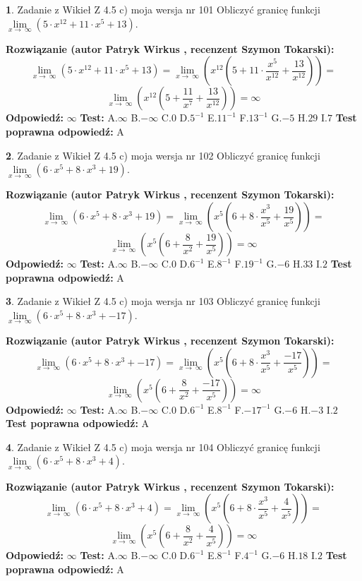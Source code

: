 \documentclass[12pt, a4paper]{article}
\theoremstyle{definition} %
\newtheorem{zad}{}
\newcommand{\zadStart}[1]{\begin{zad}#1\newline}
\newcommand{\zadStop}{\end{zad}}
\newcommand{\rozwStart}[2]{\noindent \textbf{Rozwiązanie (autor #1 , recenzent #2): }\newline}
\newcommand{\rozwStop}{\newline}
\newcommand{\odpStart}{\noindent \textbf{Odpowiedź:}\newline}
\newcommand{\odpStop}{\newline}
\newcommand{\testStart}{\noindent \textbf{Test:}\newline}
\newcommand{\testStop}{\newline}
\newcommand{\kluczStart}{\noindent \textbf{Test poprawna odpowiedź:}\newline}
\newcommand{\kluczStop}{\newline}
\begin{document}
\zadStart{Zadanie z Wikieł Z 4.5 c) moja wersja nr 101}
Obliczyć granicę funkcji  $\lim\limits_{x\to\ \infty}(5 \cdot x^{12}+11 \cdot x^{5}+13)$.
\zadStop
\rozwStart{Patryk Wirkus}{Szymon Tokarski}
$$\lim\limits_{x\to\ \infty}(5 \cdot x^{12}+11 \cdot x^{5}+13) = \lim\limits_{x\to\ \infty}(x^{12}(5 +11 \cdot \frac{x^{5}}{x^{12}}+\frac{13}{x^{12}})) =$$ $$\lim\limits_{x\to\ \infty}(x^{12}(5 +\frac{11}{x^{7}}+\frac{13}{x^{12}})) =\infty$$
\rozwStop
\odpStart
$\infty$
\odpStop
\testStart
A.$\infty$ B.$-\infty$ C.$0$ D.$5^{-1}$ E.$11^{-1}$
F.$13^{-1}$ G.$-5$
H.$29$
I.$7$
\testStop
\kluczStart
A
\kluczStop



\zadStart{Zadanie z Wikieł Z 4.5 c) moja wersja nr 102}
Obliczyć granicę funkcji  $\lim\limits_{x\to\ \infty}(6 \cdot x^{5}+8 \cdot x^{3}+19)$.
\zadStop
\rozwStart{Patryk Wirkus}{Szymon Tokarski}
$$\lim\limits_{x\to\ \infty}(6 \cdot x^{5}+8 \cdot x^{3}+19) = \lim\limits_{x\to\ \infty}(x^{5}(6 +8 \cdot \frac{x^{3}}{x^{5}}+\frac{19}{x^{5}})) =$$ $$\lim\limits_{x\to\ \infty}(x^{5}(6 +\frac{8}{x^{2}}+\frac{19}{x^{5}})) =\infty$$
\rozwStop
\odpStart
$\infty$
\odpStop
\testStart
A.$\infty$ B.$-\infty$ C.$0$ D.$6^{-1}$ E.$8^{-1}$
F.$19^{-1}$ G.$-6$
H.$33$
I.$2$
\testStop
\kluczStart
A
\kluczStop



\zadStart{Zadanie z Wikieł Z 4.5 c) moja wersja nr 103}
Obliczyć granicę funkcji  $\lim\limits_{x\to\ \infty}(6 \cdot x^{5}+8 \cdot x^{3}+-17)$.
\zadStop
\rozwStart{Patryk Wirkus}{Szymon Tokarski}
$$\lim\limits_{x\to\ \infty}(6 \cdot x^{5}+8 \cdot x^{3}+-17) = \lim\limits_{x\to\ \infty}(x^{5}(6 +8 \cdot \frac{x^{3}}{x^{5}}+\frac{-17}{x^{5}})) =$$ $$\lim\limits_{x\to\ \infty}(x^{5}(6 +\frac{8}{x^{2}}+\frac{-17}{x^{5}})) =\infty$$
\rozwStop
\odpStart
$\infty$
\odpStop
\testStart
A.$\infty$ B.$-\infty$ C.$0$ D.$6^{-1}$ E.$8^{-1}$
F.$-17^{-1}$ G.$-6$
H.$-3$
I.$2$
\testStop
\kluczStart
A
\kluczStop



\zadStart{Zadanie z Wikieł Z 4.5 c) moja wersja nr 104}
Obliczyć granicę funkcji  $\lim\limits_{x\to\ \infty}(6 \cdot x^{5}+8 \cdot x^{3}+4)$.
\zadStop
\rozwStart{Patryk Wirkus}{Szymon Tokarski}
$$\lim\limits_{x\to\ \infty}(6 \cdot x^{5}+8 \cdot x^{3}+4) = \lim\limits_{x\to\ \infty}(x^{5}(6 +8 \cdot \frac{x^{3}}{x^{5}}+\frac{4}{x^{5}})) =$$ $$\lim\limits_{x\to\ \infty}(x^{5}(6 +\frac{8}{x^{2}}+\frac{4}{x^{5}})) =\infty$$
\rozwStop
\odpStart
$\infty$
\odpStop
\testStart
A.$\infty$ B.$-\infty$ C.$0$ D.$6^{-1}$ E.$8^{-1}$
F.$4^{-1}$ G.$-6$
H.$18$
I.$2$
\testStop
\kluczStart
A
\kluczStop
\end{document}
